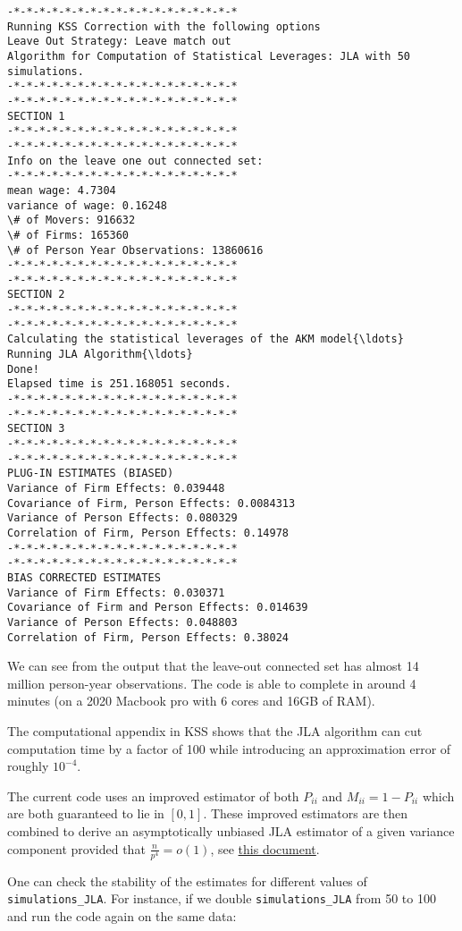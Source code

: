 \documentclass[11pt]{article}
\begin{document}
    \begin{Verbatim}[commandchars=\\\{\}]
-*-*-*-*-*-*-*-*-*-*-*-*-*-*-*-*-*-*
Running KSS Correction with the following options
Leave Out Strategy: Leave match out
Algorithm for Computation of Statistical Leverages: JLA with 50 simulations.
-*-*-*-*-*-*-*-*-*-*-*-*-*-*-*-*-*-*
-*-*-*-*-*-*-*-*-*-*-*-*-*-*-*-*-*-*
SECTION 1
-*-*-*-*-*-*-*-*-*-*-*-*-*-*-*-*-*-*
-*-*-*-*-*-*-*-*-*-*-*-*-*-*-*-*-*-*
Info on the leave one out connected set:
-*-*-*-*-*-*-*-*-*-*-*-*-*-*-*-*-*-*
mean wage: 4.7304
variance of wage: 0.16248
\# of Movers: 916632
\# of Firms: 165360
\# of Person Year Observations: 13860616
-*-*-*-*-*-*-*-*-*-*-*-*-*-*-*-*-*-*
-*-*-*-*-*-*-*-*-*-*-*-*-*-*-*-*-*-*
SECTION 2
-*-*-*-*-*-*-*-*-*-*-*-*-*-*-*-*-*-*
-*-*-*-*-*-*-*-*-*-*-*-*-*-*-*-*-*-*
Calculating the statistical leverages of the AKM model{\ldots}
Running JLA Algorithm{\ldots}
Done!
Elapsed time is 251.168051 seconds.
-*-*-*-*-*-*-*-*-*-*-*-*-*-*-*-*-*-*
-*-*-*-*-*-*-*-*-*-*-*-*-*-*-*-*-*-*
SECTION 3
-*-*-*-*-*-*-*-*-*-*-*-*-*-*-*-*-*-*
-*-*-*-*-*-*-*-*-*-*-*-*-*-*-*-*-*-*
PLUG-IN ESTIMATES (BIASED)
Variance of Firm Effects: 0.039448
Covariance of Firm, Person Effects: 0.0084313
Variance of Person Effects: 0.080329
Correlation of Firm, Person Effects: 0.14978
-*-*-*-*-*-*-*-*-*-*-*-*-*-*-*-*-*-*
-*-*-*-*-*-*-*-*-*-*-*-*-*-*-*-*-*-*
BIAS CORRECTED ESTIMATES
Variance of Firm Effects: 0.030371
Covariance of Firm and Person Effects: 0.014639
Variance of Person Effects: 0.048803
Correlation of Firm, Person Effects: 0.38024
    \end{Verbatim}

    We can see from the output that the leave-out connected set has almost
14 million person-year observations. The code is able to complete in
around 4 minutes (on a 2020 Macbook pro with 6 cores and 16GB of RAM).

The computational appendix in KSS shows that the JLA algorithm can cut
computation time by a factor of 100 while introducing an approximation
error of roughly \(10^{-4}\).

The current code uses an improved estimator of both \(P_{ii}\) and
\(M_{ii}=1-P_{ii}\) which are both guaranteed to lie in \([0,1]\). These
improved estimators are then combined to derive an asymptotically unbiased JLA
estimator of a given variance component provided that
\(\frac{n}{p^{4}}=o(1)\), see \href{https://www.dropbox.com/s/i28yvzae2tnp2tl/improved_JLA.pdf?dl=1}{this document}.

One can check the stability of the estimates for different values of
\texttt{simulations\_JLA}. For instance, if we double
\texttt{simulations\_JLA} from 50 to 100 and run the code again on the
same data:
\end{document}
